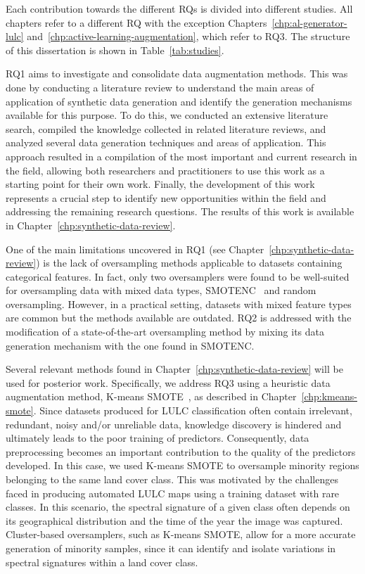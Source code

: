 Each contribution towards the different RQs is divided into different studies.
All chapters refer to a different RQ with the exception
Chapters~\ref{chp:al-generator-lulc}
and~\ref{chp:active-learning-augmentation}, which refer to RQ3. The structure
of this dissertation is shown in Table~\ref{tab:studies}.

RQ1 aims to investigate and consolidate data augmentation methods. This was
done by conducting a literature review to understand the main areas of
application of synthetic data generation and identify the generation
mechanisms available for this purpose. To do this, we conducted an extensive
literature search, compiled the knowledge collected in related literature
reviews, and analyzed several data generation techniques and areas of
application. This approach resulted in a compilation of the most important and
current research in the field, allowing both researchers and practitioners to
use this work as a starting point for their own work. Finally, the development
of this work represents a crucial step to identify new opportunities within
the field and addressing the remaining research questions. The results of this
work is available in Chapter~\ref{chp:synthetic-data-review}.

One of the main limitations uncovered in RQ1 (see
Chapter~\ref{chp:synthetic-data-review}) is the lack of oversampling
methods applicable to datasets containing categorical features. In fact, only
two oversamplers were found to be well-suited for oversampling data with mixed
data types, SMOTENC~\cite{Chawla2002} and random oversampling.  However, in a
practical setting, datasets with mixed feature types are common but the
methods available are outdated. RQ2 is addressed with the modification of a
state-of-the-art oversampling method by mixing its data generation mechanism
with the one found in SMOTENC\@.

Several relevant methods found in Chapter~\ref{chp:synthetic-data-review}
will be used for posterior work. Specifically, we address RQ3 using a
heuristic data augmentation method, K-means SMOTE~\cite{Douzas2018}, as
described in Chapter~\ref{chp:kmeans-smote}. Since datasets produced for LULC
classification often contain irrelevant, redundant, noisy and/or unreliable
data, knowledge discovery is hindered and ultimately leads to the poor
training of predictors. Consequently, data preprocessing becomes an important
contribution to the quality of the predictors developed. In this case, we used
K-means SMOTE to oversample minority regions belonging to the same land cover
class. This was motivated by the challenges faced in producing automated LULC
maps using a training dataset with rare classes. In this scenario, the
spectral signature of a given class often depends on its geographical
distribution and the time of the year the image was captured. Cluster-based
oversamplers, such as K-means SMOTE, allow for a more accurate generation of
minority samples, since it can identify and isolate variations in spectral
signatures within a land cover class.

